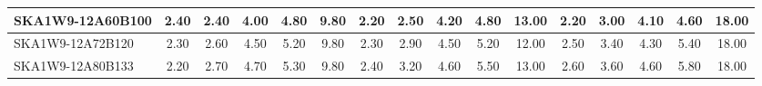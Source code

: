 \begin{table}[H]
{{\begin{tabular}{|lccccc||ccccc||ccccc|}
SKA1W9-12A60B100 & 2.40 \cellcolor{blue!27.33} & 2.40 \cellcolor{red!18.00} & 4.00 \cellcolor{green!30.00} & 4.80 \cellcolor{orange!18.00} & 9.80 \cellcolor{purple!60.00} & 2.20 \cellcolor{blue!18.00} & 2.50 \cellcolor{red!21.00} & 4.20 \cellcolor{green!23.25} & 4.80 \cellcolor{orange!23.25} & 13.00 \cellcolor{purple!60.00} & 2.20 \cellcolor{blue!22.20} & 3.00 \cellcolor{red!28.50} & 4.10 \cellcolor{green!30.00} & 4.60 \cellcolor{orange!24.00} & 18.00 \cellcolor{purple!60.00}\\ \hline 
SKA1W9-12A72B120 & 2.30 \cellcolor{blue!22.67} & 2.60 \cellcolor{red!24.46} & 4.50 \cellcolor{green!45.00} & 5.20 \cellcolor{orange!42.00} & 9.80 \cellcolor{purple!60.00} & 2.30 \cellcolor{blue!23.25} & 2.90 \cellcolor{red!33.00} & 4.50 \cellcolor{green!39.00} & 5.20 \cellcolor{orange!44.25} & 12.00 \cellcolor{purple!18.00} & 2.50 \cellcolor{blue!34.80} & 3.40 \cellcolor{red!42.50} & 4.30 \cellcolor{green!42.00} & 5.40 \cellcolor{orange!48.00} & 18.00 \cellcolor{purple!60.00}\\ \hline 
SKA1W9-12A80B133 & 2.20 \cellcolor{blue!18.00} & 2.70 \cellcolor{red!27.69} & 4.70 \cellcolor{green!51.00} & 5.30 \cellcolor{orange!48.00} & 9.80 \cellcolor{purple!60.00} & 2.40 \cellcolor{blue!28.50} & 3.20 \cellcolor{red!42.00} & 4.60 \cellcolor{green!44.25} & 5.50 \cellcolor{orange!60.00} & 13.00 \cellcolor{purple!60.00} & 2.60 \cellcolor{blue!39.00} & 3.60 \cellcolor{red!49.50} & 4.60 \cellcolor{green!60.00} & 5.80 \cellcolor{orange!60.00} & 18.00 \cellcolor{purple!60.00}\\ \hline 
\end{tabular}}
\vspace{-0.300000cm}
\hspace{1cm} 
}
\end{table}
